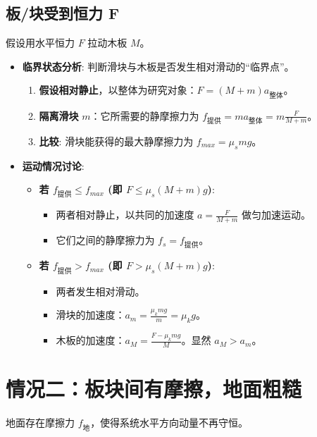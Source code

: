 \documentclass[a4paper,11pt]{ctexart}
\begin{document}
\subsection{板/块受到恒力 F}
假设用水平恒力 $F$ 拉动木板 $M$。
\begin{itemize}
    \item \textbf{临界状态分析}: 判断滑块与木板是否发生相对滑动的“临界点”。
        \begin{enumerate}
            \item \textbf{假设相对静止}，以整体为研究对象：$F = (M+m)a_{整体}$。
            \item \textbf{隔离滑块} $m$：它所需要的静摩擦力为 $f_{提供} = ma_{整体} = m\frac{F}{M+m}$。
            \item \textbf{比较}: 滑块能获得的最大静摩擦力为 $f_{max} = \mu_s mg$。
        \end{enumerate}
    \item \textbf{运动情况讨论}:
        \begin{itemize}
            \item \textbf{若 $f_{提供} \le f_{max}$ (即 $F \le \mu_s(M+m)g$)}:
                \begin{itemize}
                    \item 两者相对静止，以共同的加速度 $a = \frac{F}{M+m}$ 做匀加速运动。
                    \item 它们之间的静摩擦力为 $f_s = f_{提供}$。
                \end{itemize}
            \item \textbf{若 $f_{提供} > f_{max}$ (即 $F > \mu_s(M+m)g$)}:
                \begin{itemize}
                    \item 两者发生相对滑动。
                    \item 滑块的加速度：$a_m = \frac{\mu_k mg}{m} = \mu_k g$。
                    \item 木板的加速度：$a_M = \frac{F - \mu_k mg}{M}$。显然 $a_M > a_m$。
                \end{itemize}
        \end{itemize}
\end{itemize}

\section{情况二：板块间有摩擦，地面粗糙}
地面存在摩擦力 $f_{地}$，使得系统水平方向动量不再守恒。
\end{document}

